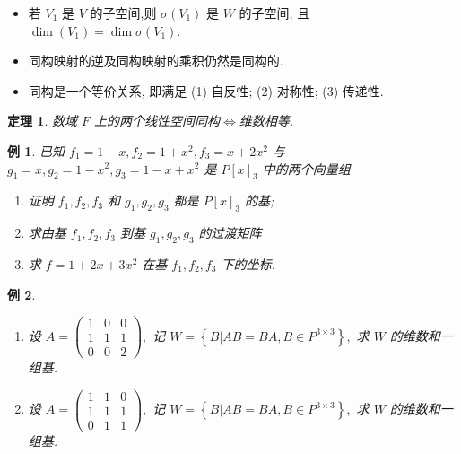\documentclass[13pt]{beamer}
\newtheorem{thm}{定理}
\newtheorem{exa}{例}
\def\dim{\operatorname{dim}}
\begin{document}
\begin{frame}
\begin{itemize}

\item 若 $V_{1}$ 是 $V$ 的子空间,则 $\sigma \left(V_{1}\right)$ 是 $W$ 的子空间, 且 $\dim (V_1) =\dim \sigma \left(V_{1}\right)$.

\item 同构映射的逆及同构映射的乘积仍然是同构的.

\item  同构是一个等价关系, 即满足
        (1) 自反性; 
        (2) 对称性; 
        (3) 传递性. 
\end{itemize}
\begin{thm}
数域 $F$ 上的两个线性空间同构$\Leftrightarrow$维数相等.
\end{thm}
\end{frame}

\setcounter{exa}{0}
\begin{frame}

\begin{exa}
 已知 $f_{1}=1-x, f_{2}=1+x^{2}, f_{3}=x+2 x^{2}$ 与 $g_{1}=x, g_{2}=1-x^{2}, g_{3}=1-x+x^{2}$ 是 $P[x]_{3}$ 中的两个向量组
 \begin{enumerate}
\item 证明 $f_{1}, f_{2}, f_{3}$ 和 $g_{1}, g_{2}, g_{3}$ 都是 $P[x]_{3}$ 的基;
\item 求由基 $f_{1}, f_{2}, f_{3}$ 到基 $g_{1}, g_{2}, g_{3}$ 的过渡矩阵
\item 求 $f=1+2 x+3 x^{2}$ 在基 $f_{1}, f_{2}, f_{3}$ 下的坐标.
 \end{enumerate}

\end{exa}
\end{frame}

\begin{frame}
\small{\begin{exa}
\begin{enumerate}
\item 设 $A=\left(\begin{array}{ccc}1 & 0 & 0 \\ 1 & 1 & 1 \\ 0 & 0 & 2\end{array}\right),$ 记 $W=\left\{B | A B=B A, B \in P^{3 \times 3}\right\},$ 求 $W$ 的维数和一组基.
\item 设 $A=\left(\begin{array}{ccc}1 & 1 & 0 \\ 1 & 1 & 1 \\ 0 & 1 & 1\end{array}\right),$ 记 $W=\left\{B | A B=B A, B \in P^{3 \times 3}\right\},$ 求 $W$ 的维数和一组基.
\end{enumerate}
\end{exa}}
\end{frame}
\end{document}
